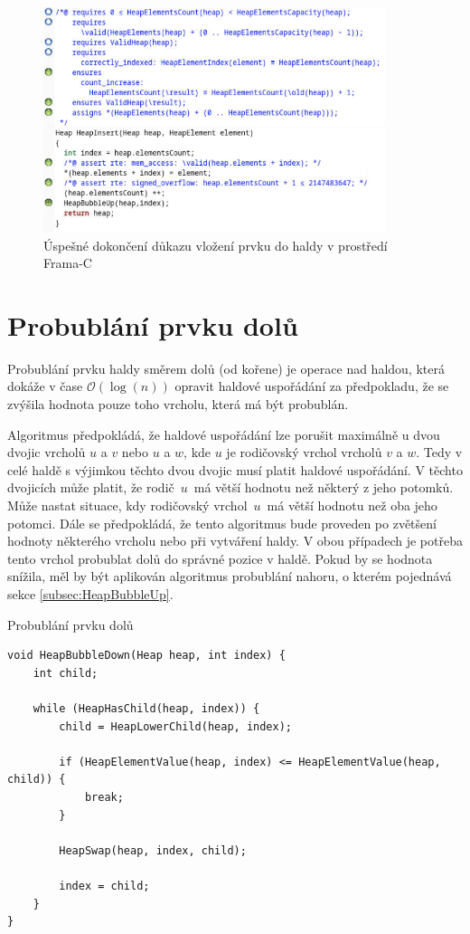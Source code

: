 \begin{figure}[H]
	\centering
	\includegraphics[width=10cm]{images/frama-c-HeapInsert}
	\caption{Úspešné dokončení důkazu vložení prvku do haldy v prostředí Frama-C}
	\label{img:F-C-HeapInsert}
\end{figure}


\section{Probublání prvku dolů}
\label{subsec:HeapBubbleDown}

Probublání prvku haldy směrem dolů (od kořene) je operace nad haldou, která dokáže v čase $\mathcal{O}(\log(n))$ opravit haldové uspořádání za předpokladu, že se zvýšila hodnota pouze toho vrcholu, která má být probublán.

Algoritmus předpokládá, že haldové uspořádání lze porušit maximálně u dvou dvojic vrcholů $u$ a $v$ nebo $u$ a $w$, kde $u$ je rodičovský vrchol vrcholů $v$ a $w$. Tedy v celé haldě s výjimkou těchto dvou dvojic musí platit haldové uspořádání. V těchto dvojicích může platit, že rodič~$u$~má větší hodnotu než některý z jeho potomků. Může nastat situace, kdy rodičovský vrchol~$u$~má větší hodnotu než oba jeho potomci. Dále se předpokládá, že tento algoritmus bude proveden po zvětšení hodnoty některého vrcholu nebo při vytváření haldy. V obou případech je potřeba tento vrchol probublat dolů do správné pozice v haldě. Pokud by se hodnota snížila, měl by být aplikován algoritmus probublání nahoru, o kterém pojednává sekce \ref{subsec:HeapBubbleUp}.


\begin{listing}[H]
	\caption{Probublání prvku dolů}
	\label{list:HeapBubbleDown}
	\begin{verbatim}
void HeapBubbleDown(Heap heap, int index) {
    int child;

    while (HeapHasChild(heap, index)) {
        child = HeapLowerChild(heap, index);

        if (HeapElementValue(heap, index) <= HeapElementValue(heap, child)) {
            break;
        }

        HeapSwap(heap, index, child);

        index = child;
    }
}
	\end{verbatim}
\end{listing}

